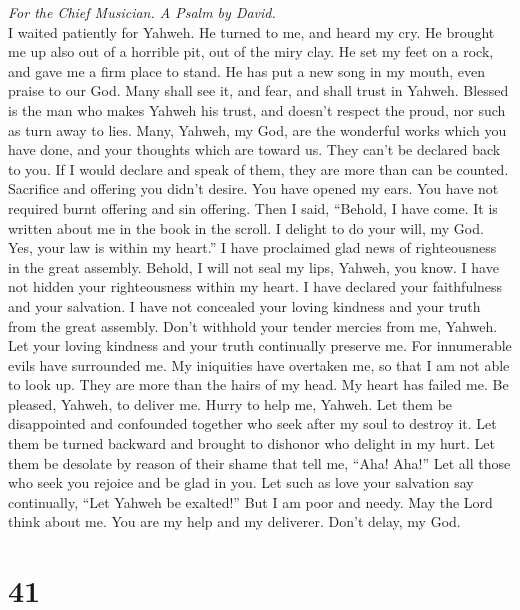 \emph{For the Chief Musician. A Psalm by David.}\\
 I waited patiently for Yahweh. He turned to me, and heard
my cry.  He brought me up also out of a horrible pit, out
of the miry clay. He set my feet on a rock, and gave me a firm place to
stand.  He has put a new song in my mouth, even praise to
our God. Many shall see it, and fear, and shall trust in Yahweh.
 Blessed is the man who makes Yahweh his trust, and
doesn't respect the proud, nor such as turn away to lies. 
Many, Yahweh, my God, are the wonderful works which you have done, and
your thoughts which are toward us. They can't be declared back to you.
If I would declare and speak of them, they are more than can be counted.
 Sacrifice and offering you didn't desire. You have opened
my ears. You have not required burnt offering and sin offering.
 Then I said, ``Behold, I have come. It is written about
me in the book in the scroll.  I delight to do your will,
my God. Yes, your law is within my heart.''  I have
proclaimed glad news of righteousness in the great assembly. Behold, I
will not seal my lips, Yahweh, you know.  I have not
hidden your righteousness within my heart. I have declared your
faithfulness and your salvation. I have not concealed your loving
kindness and your truth from the great assembly.  Don't
withhold your tender mercies from me, Yahweh. Let your loving kindness
and your truth continually preserve me.  For innumerable
evils have surrounded me. My iniquities have overtaken me, so that I am
not able to look up. They are more than the hairs of my head. My heart
has failed me.  Be pleased, Yahweh, to deliver me. Hurry
to help me, Yahweh.  Let them be disappointed and
confounded together who seek after my soul to destroy it. Let them be
turned backward and brought to dishonor who delight in my hurt.
 Let them be desolate by reason of their shame that tell
me, ``Aha! Aha!''  Let all those who seek you rejoice and
be glad in you. Let such as love your salvation say continually, ``Let
Yahweh be exalted!''  But I am poor and needy. May the
Lord think about me. You are my help and my deliverer. Don't delay, my
God.

\hypertarget{section-40}{%
\section{41}\label{section-40}}

